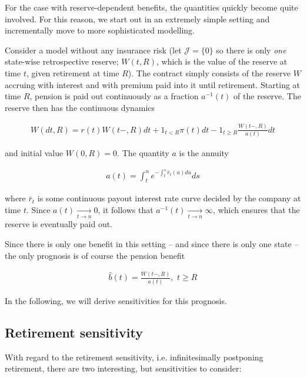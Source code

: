 \documentclass{book}
\newcommand{\1}[1]{\mathbbm{1}_{\left\lbrace #1 \right\rbrace}}
\theoremstyle{break}
\theoremstyle{remark}
\numberwithin{equation}{section}
\begin{document}
For the case with reserve-dependent benefits, the quantities quickly become quite involved. For this reason, we start out in an extremely simple setting and incrementally move to more sophisticated modelling.

Consider a model without any insurance risk (let $\mathcal{J} = \{ 0 \}$ so there is only \textit{one} state-wise retrospective reserve; $W(t,R)$, which is the value of the reserve at time $t$, given retirement at time $R$). The contract simply consists of the reserve $W$ accruing with interest and with premium paid into it until retirement. Starting at time $R$, pension is paid out continuously as a fraction $a^{-1}(t)$ of the reserve. The reserve then has the continuous dynamics

\begin{align} \label{ReserveDE}
	W(dt,R) = r(t) W(t-,R) dt + 1_{t<R} \pi(t) dt - 1_{t \geq R} \frac{W(t-,R)}{a(t)} dt
\end{align}

and initial value $W(0,R)=0$. The quantity $a$ is the annuity

\begin{align*}
	a(t) = \int_t^n e^{-\int_t^s \bar{r}_t(u) du} ds
\end{align*}

where $\bar{r}_t$ is some continuous payout interest rate curve decided by the company at time $t$. Since $a(t) \underset{t \to n}{\longrightarrow} 0$, it follows that $a^{-1}(t) \underset{t \to n}{\longrightarrow} \infty$, which ensures that the reserve is eventually paid out.

Since there is only one benefit in this setting -- and since there is only one state -- the only prognosis is of course the pension benefit

\begin{align*}
	\hat{b}(t) = \frac{W(t-,R)}{a(t)}, \, \, t \geq R
\end{align*}

In the following, we will derive sensitivities for this prognosis.

\subsection{Retirement sensitivity}

With regard to the retirement sensitivity, i.e. infinitesimally postponing retirement, there are two interesting, but sensitivities to consider:
\end{document}
